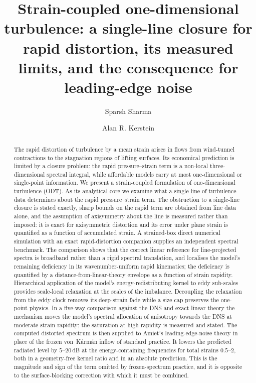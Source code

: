 \documentclass[11pt,a4paper]{article}
\title{Strain-coupled one-dimensional turbulence: a single-line closure
for rapid distortion, its measured limits, and the consequence for
leading-edge noise}
\author{Sparsh Sharma\aff{1} \and Alan R. Kerstein\aff{2}}
\affiliation{\aff{1}German Aerospace Center (DLR), 38108 Braunschweig, Germany
\aff{2}Consultant, Danville, CA 94526, USA}
\newcounter{assumption}
\begin{document}
\maketitle

\begin{abstract}
The rapid distortion of turbulence by a mean strain arises in flows from
wind-tunnel contractions to the stagnation regions of lifting surfaces.
Its economical prediction is limited by a closure problem: the rapid
pressure--strain term is a non-local three-dimensional spectral integral,
while affordable models carry at most one-dimensional or single-point
information. We present a strain-coupled formulation of one-dimensional
turbulence (ODT). As its analytical core we examine what a single line of
turbulence data determines about the rapid pressure--strain term. The
obstruction to a single-line closure is stated exactly, sharp bounds on
the rapid term are obtained from line data alone, and the assumption of
axisymmetry about the line is measured rather than imposed: it is exact
for axisymmetric distortion and its error under plane strain is quantified
as a function of accumulated strain. A strained-box direct numerical
simulation with an exact rapid-distortion companion supplies an independent
spectral benchmark. The comparison shows that the correct linear reference
for line-projected spectra is broadband rather than a rigid spectral
translation, and localises the model's remaining deficiency in its
wavenumber-uniform rapid kinematics; the deficiency is quantified by a
distance-from-linear-theory envelope as a function of strain rapidity.
Hierarchical application of the model's energy-redistributing kernel to
eddy sub-scales provides scale-local relaxation at the scales of the
imbalance. Decoupling the relaxation from the eddy clock removes its
deep-strain fade while a size cap preserves the one-point physics. In a
five-way comparison against the DNS and exact linear theory the mechanism
moves the model's spectral allocation of anisotropy towards the DNS at
moderate strain rapidity; the saturation at high rapidity is measured and
stated. The computed distorted spectrum is then supplied to Amiet's
leading-edge-noise theory in place of the frozen von~K\'arm\'an inflow of
standard practice. It lowers the predicted radiated level by $5$--$20$\,dB
at the energy-containing frequencies for total strains $0.5$--$2$, both in
a geometry-free kernel ratio and in an absolute prediction. This is the
magnitude and sign of the term omitted by frozen-spectrum practice, and
it is opposite to the surface-blocking correction with which it must be
combined.
\end{abstract}
\end{document}
